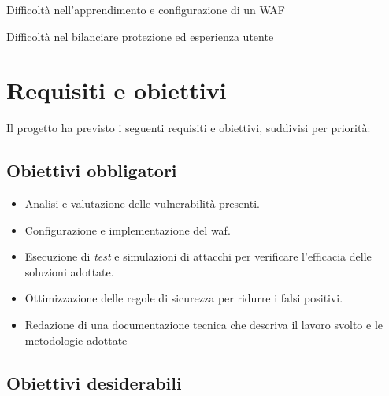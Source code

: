 \begin{risk}{Difficoltà nell'apprendimento e configurazione di un WAF}
    \label{risk:learning-waf} 
\end{risk}

\begin{risk}{Difficoltà nel bilanciare protezione ed esperienza utente}
    \label{risk:policy-tuning} 
\end{risk}

\section{Requisiti e obiettivi}

Il progetto ha previsto i seguenti requisiti e obiettivi, suddivisi per priorità:

\subsection*{Obiettivi obbligatori}

\begin{itemize}
    \item Analisi e valutazione delle vulnerabilità presenti.
    \item Configurazione e implementazione del \gls{waf}.
    \item Esecuzione di \emph{test} e simulazioni di attacchi per verificare l'efficacia delle soluzioni adottate.
    \item Ottimizzazione delle regole di sicurezza per ridurre i falsi positivi.
    \item Redazione di una documentazione tecnica che descriva il lavoro svolto e le metodologie adottate
\end{itemize}

\subsection*{Obiettivi desiderabili}

